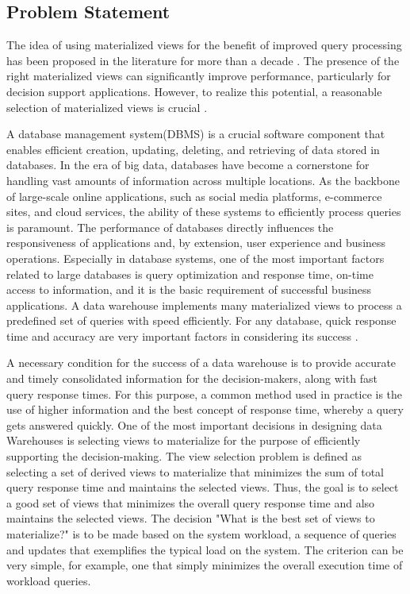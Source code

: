 \subsection{Problem Statement}
The idea of using materialized views for the benefit of improved query processing has been proposed in the literature for more than a decade \cite{Blakeley1986EfficientlyUM}. The presence of the right materialized views can significantly improve performance, particularly for decision support applications. However, to realize this potential, a reasonable selection of materialized views is crucial \cite{agrawal2000automated}. \vspace{.4cm}

A database management system(DBMS) is a crucial software component that enables efficient creation, updating, deleting, and retrieving of data stored in databases. In the era of big data, databases have become a cornerstone for handling vast amounts of information across multiple locations. As the backbone of large-scale online applications, such as social media platforms, e-commerce sites, and cloud services, the ability of these systems to efficiently process queries is paramount. The performance of databases directly influences the responsiveness of applications and, by extension, user experience and business operations.\cite{4} Especially in database systems, one of the most important factors related to large databases is query optimization and response time, on-time access to information, and it is the basic requirement of successful business applications. A data warehouse implements many materialized views to process a predefined set of queries with speed efficiently. For any database, quick response time and accuracy are very important factors in considering its success \cite{karde2010selection}.\vspace{.4cm} 

A necessary condition for the success of a data warehouse is to provide accurate and timely consolidated information for the decision-makers, along with fast query response times. For this purpose, a common method used in practice is the use of higher information and the best concept of response time, whereby a query gets answered quickly. One of the most important decisions in designing data Warehouses is selecting views to materialize for the purpose of efficiently supporting the decision-making. The view selection problem is defined as selecting a set of derived views to materialize that minimizes the sum of total query response time and maintains the selected views. Thus, the goal is to select a good set of views that minimizes the overall query response time and also maintains the selected views. The decision "What is the best set of views to materialize?" is to be made based on the system workload, a sequence of queries and updates that exemplifies the typical load on the system. The criterion can be very simple, for example, one that simply minimizes the overall execution time of workload queries.\vspace{.4cm}

